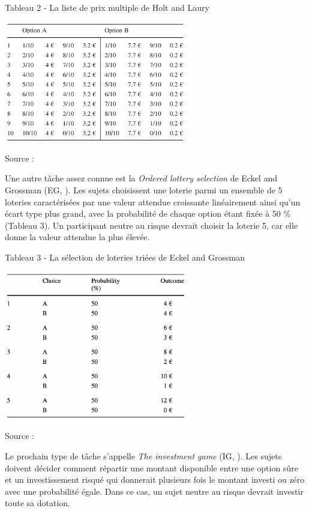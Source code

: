 \documentclass[12pt]{article}
\begin{document}
Tableau 2 - La liste de prix multiple de Holt and Laury

\hfil \includegraphics[width=0.6\textwidth,height=0.3\textheight]{HL.png}
\hfil

Source : \citet{Holt2002}

Une autre tâche assez connue est la \emph{Ordered lottery selection} de
Eckel and Grossman (EG, \citet{Eckel2002}). Les sujets choisissent une
loterie parmi un ensemble de 5 loteries caractérisées par une valeur
attendue croissante linéairement ainsi qu'un écart type plus grand, avec
la probabilité de chaque option étant fixée à 50 \% (Tableau 3). Un
participant neutre au risque devrait choisir la loterie 5, car elle
donne la valeur attendue la plus élevée.

Tableau 3 - La sélection de loteries triées de Eckel and Grossman

\hfil \includegraphics[width=0.6\textwidth,height=0.3\textheight]{EG.png}
\hfil

Source : \citet{Eckel2002}

Le prochain type de tâche s'appelle \emph{The investment game} (IG,
\citet{Gneezy1997}). Les sujets doivent décider comment répartir une
montant disponible entre une option sûre et un investissement risqué qui
donnerait plusieurs fois le montant investi ou zéro avec une probabilité
égale. Dans ce cas, un sujet neutre au risque devrait investir toute sa
dotation.
\end{document}
